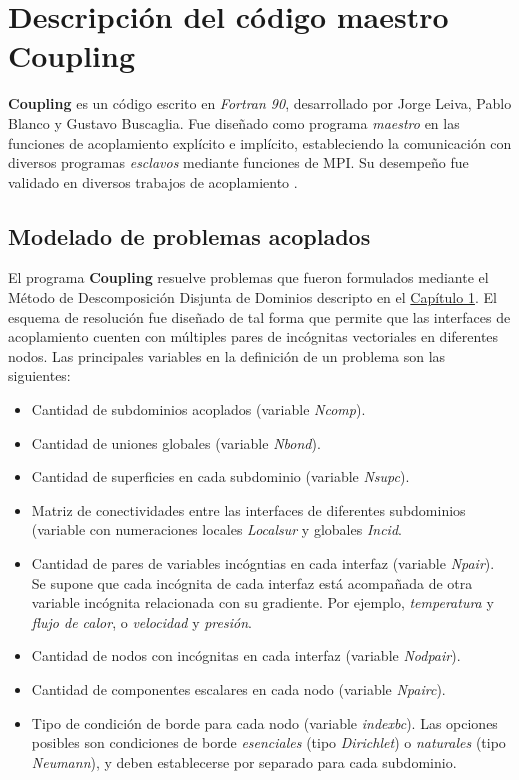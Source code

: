 \chapter{Descripción del código maestro \textbf{Coupling}}
\label{C:coupling}

\textbf{Coupling} es un código escrito en \textit{Fortran 90}, desarrollado por Jorge Leiva, Pablo Blanco y Gustavo Buscaglia.
Fue diseñado como programa \textit{maestro} en las funciones de acoplamiento explícito e implícito,
estableciendo la comunicación con diversos programas \textit{esclavos} mediante funciones de MPI.
Su desempeño fue validado en diversos trabajos de acoplamiento \cite{coup-0d3d} \cite{coup-black} \cite{coup-hyd} \cite{coup-strong}.

\section{Modelado de problemas acoplados}
\label{ap1:definicion}
El programa \textbf{Coupling} resuelve problemas que fueron formulados mediante el Método de Descomposición Disjunta de Dominios descripto en el \hyperlink{chapter.1}{Capítulo 1}.
El esquema de resolución fue diseñado de tal forma que permite que las interfaces de acoplamiento cuenten con múltiples pares de incógnitas vectoriales en diferentes nodos.
Las principales variables en la definición de un problema son las siguientes:
\begin{itemize}
\item Cantidad de subdominios acoplados (variable \textit{Ncomp}).
\item Cantidad de uniones globales (variable \textit{Nbond}).
\item Cantidad de superficies en cada subdominio (variable \textit{Nsupc}).
\item Matriz de conectividades entre las interfaces de diferentes subdominios (variable con numeraciones locales \textit{Localsur} y globales \textit{Incid}.
\item Cantidad de pares de variables incógntias en cada interfaz (variable \textit{Npair}).
Se supone que cada incógnita de cada interfaz está acompañada de otra variable incógnita relacionada con su gradiente.
Por ejemplo, \textit{temperatura} y \textit{flujo de calor}, o \textit{velocidad} y \textit{presión}.
\item Cantidad de nodos con incógnitas en cada interfaz (variable \textit{Nodpair}).
\item Cantidad de componentes escalares en cada nodo (variable \textit{Npairc}).
\item Tipo de condición de borde para cada nodo (variable \textit{indexbc}).
Las opciones posibles son condiciones de borde \textit{esenciales} (tipo \textit{Dirichlet}) o \textit{naturales} (tipo \textit{Neumann}), y deben establecerse por separado para cada subdominio.
\end{itemize}
